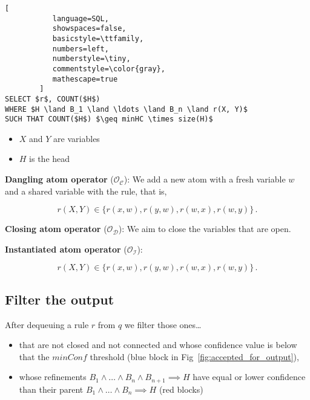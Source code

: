 \documentclass{article}
\begin{document}

\begin{lstlisting}[
           language=SQL,
           showspaces=false,
           basicstyle=\ttfamily,
           numbers=left,
           numberstyle=\tiny,
           commentstyle=\color{gray},
           mathescape=true
        ]
SELECT $r$, COUNT($H$)
WHERE $H \land B_1 \land \ldots \land B_n \land r(X, Y)$
SUCH THAT COUNT($H$) $\geq minHC \times size(H)$
\end{lstlisting}

\begin{itemize}
    \item $X$ and $Y$ are variables
    \item $H$ is the head
\end{itemize}

\noindent \textbf{Dangling atom operator} ($\mathcal{O}_\mathcal{C}$): We add a new atom with a
fresh variable $w$ and a shared variable with the rule, that is,

\begin{equation}
    r(X, Y) \in \{ r(x, w), r(y, w), r(w, x), r(w, y) \}\,.
\end{equation}

\noindent \textbf{Closing atom operator} ($\mathcal{O}_\mathcal{D}$): We aim to close the variables
that are open.

\noindent \textbf{Instantiated atom operator} ($\mathcal{O}_\mathcal{I}$):

\begin{equation}
    r(X, Y) \in \{ r(x, w), r(y, w), r(w, x), r(w, y) \}\,.
\end{equation}

\subsection{Filter the output}
\label{ssec:filter_output}

After dequeuing a rule $r$ from $q$ we filter those ones\ldots

\begin{itemize}
    \item that are not closed and not connected and whose confidence value is
        below that the $minConf$ threshold (blue block in Fig~\ref{fig:accepted_for_output}),
    \item whose refinements $B_1 \land \ldots \land B_n \land B_{n+1} \implies H$
        have equal or lower confidence than their parent
        $B_1 \land \ldots \land B_n \implies H$ (red blocks)
\end{itemize}
\end{document}
